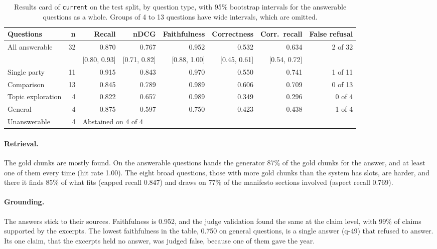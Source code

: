 \begin{table}[htbp]
    \centering
    \footnotesize
    \begin{adjustbox}{max width=\textwidth}
    \begin{tabular}{|l|r|r|r|r|r|r|r|}
        \hline
        \textbf{Questions} & \textbf{n} & \textbf{Recall} & \textbf{nDCG} & \textbf{Faithfulness} & \textbf{Correctness} & \textbf{Corr.\ recall} & \textbf{False refusal} \\
        \hline
        All answerable & 32 & 0.870 & 0.767 & 0.952 & 0.532 & 0.634 & 2 of 32 \\
         & & {\scriptsize[0.80, 0.93]} & {\scriptsize[0.71, 0.82]} & {\scriptsize[0.88, 1.00]} & {\scriptsize[0.45, 0.61]} & {\scriptsize[0.54, 0.72]} & \\
        Single party & 11 & 0.915 & 0.843 & 0.970 & 0.550 & 0.741 & 1 of 11 \\
        Comparison & 13 & 0.845 & 0.789 & 0.989 & 0.606 & 0.709 & 0 of 13 \\
        Topic exploration & 4 & 0.822 & 0.657 & 0.989 & 0.349 & 0.296 & 0 of 4 \\
        General & 4 & 0.875 & 0.597 & 0.750 & 0.423 & 0.438 & 1 of 4 \\
        \hline
        Unanswerable & 4 & \multicolumn{6}{l|}{Abstained on 4 of 4} \\
        \hline
    \end{tabular}
    \end{adjustbox}
    \caption[Results card of \sysname{}]{Results card of \texttt{current} on the
    test split, by question type, with 95\% bootstrap intervals for the
    answerable questions as a whole. Groups of 4 to 13 questions have wide
    intervals, which are omitted.}
    \label{tab:results-card}
\end{table}

\paragraph{Retrieval.} The gold chunks are mostly found. On the answerable
questions \sysname{} hands the generator 87\% of the gold chunks for
the answer, and at least one of them every time (hit rate 1.00). The eight
broad questions, those with more gold chunks than the system has slots, are
harder, and there it finds 85\% of what fits (capped recall 0.847) and draws on
77\% of the manifesto sections involved (aspect recall 0.769).

\paragraph{Grounding.} The answers stick to their sources. Faithfulness is
0.952, and the judge validation found the same at the claim level, with 99\%
of claims supported by the excerpts. The lowest faithfulness in the table, 0.750 on
general questions, is a single answer (q-49) that refused to answer. Its one
claim, that the excerpts held no answer, was judged false, because one of
them gave the year.

